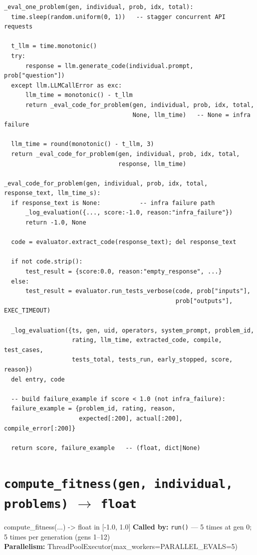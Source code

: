 \documentclass[11pt,a4paper]{report}
\newcommand{\fn}[1]{\texttt{#1}}
\begin{document}
\begin{lstlisting}[style=chain]
_eval_one_problem(gen, individual, prob, idx, total):
  time.sleep(random.uniform(0, 1))   -- stagger concurrent API requests

  t_llm = time.monotonic()
  try:
      response = llm.generate_code(individual.prompt, prob["question"])
  except llm.LLMCallError as exc:
      llm_time = monotonic() - t_llm
      return _eval_code_for_problem(gen, individual, prob, idx, total,
                                    None, llm_time)   -- None = infra failure

  llm_time = round(monotonic() - t_llm, 3)
  return _eval_code_for_problem(gen, individual, prob, idx, total,
                                response, llm_time)

_eval_code_for_problem(gen, individual, prob, idx, total, response_text, llm_time_s):
  if response_text is None:           -- infra failure path
      _log_evaluation({..., score:-1.0, reason:"infra_failure"})
      return -1.0, None

  code = evaluator.extract_code(response_text); del response_text

  if not code.strip():
      test_result = {score:0.0, reason:"empty_response", ...}
  else:
      test_result = evaluator.run_tests_verbose(code, prob["inputs"],
                                                prob["outputs"], EXEC_TIMEOUT)

  _log_evaluation({ts, gen, uid, operators, system_prompt, problem_id,
                   rating, llm_time, extracted_code, compile, test_cases,
                   tests_total, tests_run, early_stopped, score, reason})
  del entry, code

  -- build failure_example if score < 1.0 (not infra_failure):
  failure_example = {problem_id, rating, reason,
                     expected[:200], actual[:200], compile_error[:200]}

  return score, failure_example   -- (float, dict|None)
\end{lstlisting}

\section{\fn{compute\_fitness(gen, individual, problems)} $\to$ \fn{float}}

\begin{specbox}{compute\_fitness(...) -> float in [-1.0, 1.0]}
\textbf{Called by:} \fn{run()} --- 5 times at gen 0; 5 times per generation (gens 1--12)\\
\textbf{Parallelism:} ThreadPoolExecutor(max\_workers=PARALLEL\_EVALS=5)
\end{specbox}
\end{document}
